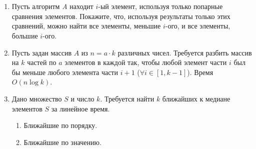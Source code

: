 \section{}

\begin{enumerate}

  \item Пусть алгоритм \textit{A} находит $i$-ый элемент,
	используя только попарные сравнения элементов. Покажите,
	что, используя результаты только этих сравнений, можно
	найти все элементы, меньшие $i$-ого, и все элементы,
	большие $i$-ого.

  \item	Пусть задан массив $A$ из $n = a \cdot k$ различных чисел. 
	Требуется разбить массив на $k$ частей по $a$
	элементов в каждой так, чтобы любой элемент
	части $i$ был бы меньше любого элемента части $i + 1$
	($\forall i \in [1, k - 1]$). Время $O(n \log k)$.

  \item Дано множество $S$ и число $k$. Требуется найти
	$k$ ближайших к медиане элементов $S$ за линейное время.
	\begin{enumerate}
		\item Ближайшие по порядку.
		\item Ближайшие по значению.
	\end{enumerate}


\end{enumerate}


